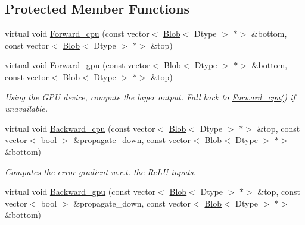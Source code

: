\subsection*{Protected Member Functions}
\begin{DoxyCompactItemize}
\item 
virtual void \mbox{\hyperlink{classcaffe_1_1_re_l_u_layer_ab9c29de12e2fac75843fe97f16fe14ba}{Forward\+\_\+cpu}} (const vector$<$ \mbox{\hyperlink{classcaffe_1_1_blob}{Blob}}$<$ Dtype $>$ $\ast$$>$ \&bottom, const vector$<$ \mbox{\hyperlink{classcaffe_1_1_blob}{Blob}}$<$ Dtype $>$ $\ast$$>$ \&top)
\item 
\mbox{\label{classcaffe_1_1_re_l_u_layer_abaf3326b871e295c943fc0668b2f5e4e}} 
virtual void \mbox{\hyperlink{classcaffe_1_1_re_l_u_layer_abaf3326b871e295c943fc0668b2f5e4e}{Forward\+\_\+gpu}} (const vector$<$ \mbox{\hyperlink{classcaffe_1_1_blob}{Blob}}$<$ Dtype $>$ $\ast$$>$ \&bottom, const vector$<$ \mbox{\hyperlink{classcaffe_1_1_blob}{Blob}}$<$ Dtype $>$ $\ast$$>$ \&top)
\begin{DoxyCompactList}\small\item\em Using the G\+PU device, compute the layer output. Fall back to \mbox{\hyperlink{classcaffe_1_1_re_l_u_layer_ab9c29de12e2fac75843fe97f16fe14ba}{Forward\+\_\+cpu()}} if unavailable. \end{DoxyCompactList}\item 
virtual void \mbox{\hyperlink{classcaffe_1_1_re_l_u_layer_a4f278f1aca7a380a24b61be5429808a4}{Backward\+\_\+cpu}} (const vector$<$ \mbox{\hyperlink{classcaffe_1_1_blob}{Blob}}$<$ Dtype $>$ $\ast$$>$ \&top, const vector$<$ bool $>$ \&propagate\+\_\+down, const vector$<$ \mbox{\hyperlink{classcaffe_1_1_blob}{Blob}}$<$ Dtype $>$ $\ast$$>$ \&bottom)
\begin{DoxyCompactList}\small\item\em Computes the error gradient w.\+r.\+t. the Re\+LU inputs. \end{DoxyCompactList}\item 
\mbox{\label{classcaffe_1_1_re_l_u_layer_a292000d3ed5d63a5a28b5a580fffc61b}} 
virtual void \mbox{\hyperlink{classcaffe_1_1_re_l_u_layer_a292000d3ed5d63a5a28b5a580fffc61b}{Backward\+\_\+gpu}} (const vector$<$ \mbox{\hyperlink{classcaffe_1_1_blob}{Blob}}$<$ Dtype $>$ $\ast$$>$ \&top, const vector$<$ bool $>$ \&propagate\+\_\+down, const vector$<$ \mbox{\hyperlink{classcaffe_1_1_blob}{Blob}}$<$ Dtype $>$ $\ast$$>$ \&bottom)

\end{DoxyCompactItemize}
